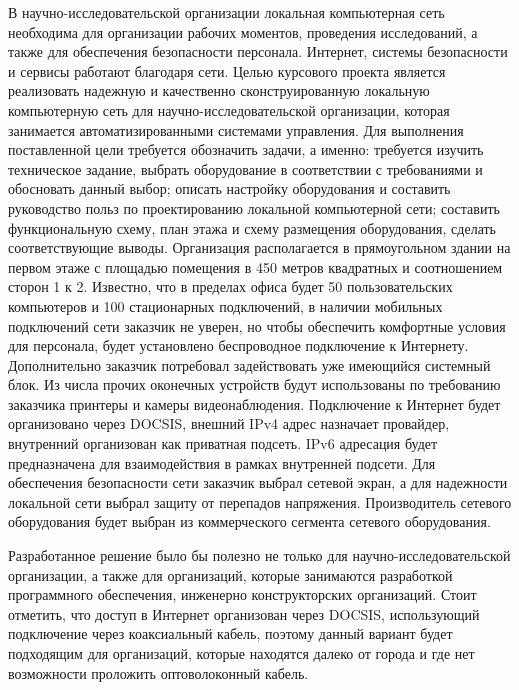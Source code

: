\label{sec:intro}
\nocite{*}

В научно-исследовательской организации локальная компьютерная сеть необходима для организации рабочих моментов, проведения исследований, 
а также для обеспечения безопасности персонала. Интернет, системы безопасности и сервисы работают благодаря сети. Целью  курсового проекта 
является реализовать надежную и качественно сконструированную локальную компьютерную сеть для научно-исследовательской организации, 
которая занимается автоматизированными системами управления. Для выполнения поставленной цели требуется обозначить задачи, а именно: 
требуется изучить техническое задание, выбрать оборудование в соответствии с требованиями и обосновать данный выбор; описать настройку оборудования 
и составить руководство польз по проектированию локальной компьютерной сети; составить функциональную схему, план этажа и схему размещения 
оборудования, сделать соответствующие  выводы. Организация располагается в прямоугольном здании на первом этаже с площадью помещения в 450 метров 
квадратных и соотношением сторон 1 к 2. Известно, что в пределах офиса будет 50 пользовательских компьютеров и 100 стационарных подключений, 
в наличии мобильных подключений сети заказчик не уверен, но чтобы обеспечить комфортные условия для персонала, будет установлено беспроводное подключение к Интернету. 
Дополнительно заказчик потребовал задействовать уже имеющийся системный блок.
Из числа прочих оконечных устройств будут использованы по требованию заказчика принтеры и камеры видеонаблюдения.
Подключение к Интернет будет организовано через DOCSIS, внешний IPv4 адрес назначает провайдер, внутренний организован как приватная подсеть. 
IPv6 адресация будет предназначена для взаимодействия в рамках внутренней подсети. 
Для обеспечения безопасности сети заказчик выбрал сетевой экран, а для надежности локальной сети выбрал защиту от перепадов напряжения.
Производитель сетевого оборудования будет выбран из коммерческого сегмента сетевого оборудования. 


Разработанное решение было бы полезно не только для научно-исследовательской организации, а также для организаций, 
которые занимаются разработкой программного обеспечения, инженерно конструкторских организаций. Стоит отметить, что доступ в Интернет организован через
DOCSIS, использующий подключение через коаксиальный кабель, поэтому данный вариант будет подходящим для организаций, которые находятся далеко от города и 
где нет возможности проложить оптоволоконный кабель.
